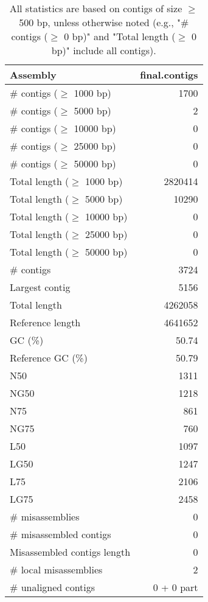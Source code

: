 \documentclass[12pt,a4paper]{article}
\begin{document}
\begin{table}[ht]
\begin{center}
\caption{All statistics are based on contigs of size $\geq$ 500 bp, unless otherwise noted (e.g., "\# contigs ($\geq$ 0 bp)" and "Total length ($\geq$ 0 bp)" include all contigs).}
\begin{tabular}{|l*{1}{|r}|}
\hline
Assembly & final.contigs \\ \hline
\# contigs ($\geq$ 1000 bp) & 1700 \\ \hline
\# contigs ($\geq$ 5000 bp) & 2 \\ \hline
\# contigs ($\geq$ 10000 bp) & 0 \\ \hline
\# contigs ($\geq$ 25000 bp) & 0 \\ \hline
\# contigs ($\geq$ 50000 bp) & 0 \\ \hline
Total length ($\geq$ 1000 bp) & 2820414 \\ \hline
Total length ($\geq$ 5000 bp) & 10290 \\ \hline
Total length ($\geq$ 10000 bp) & 0 \\ \hline
Total length ($\geq$ 25000 bp) & 0 \\ \hline
Total length ($\geq$ 50000 bp) & 0 \\ \hline
\# contigs & 3724 \\ \hline
Largest contig & 5156 \\ \hline
Total length & 4262058 \\ \hline
Reference length & 4641652 \\ \hline
GC (\%) & 50.74 \\ \hline
Reference GC (\%) & 50.79 \\ \hline
N50 & 1311 \\ \hline
NG50 & 1218 \\ \hline
N75 & 861 \\ \hline
NG75 & 760 \\ \hline
L50 & 1097 \\ \hline
LG50 & 1247 \\ \hline
L75 & 2106 \\ \hline
LG75 & 2458 \\ \hline
\# misassemblies & 0 \\ \hline
\# misassembled contigs & 0 \\ \hline
Misassembled contigs length & 0 \\ \hline
\# local misassemblies & 2 \\ \hline
\# unaligned contigs & 0 + 0 part \\ \hline

\end{tabular}
\end{center}
\end{table}
\end{document}
